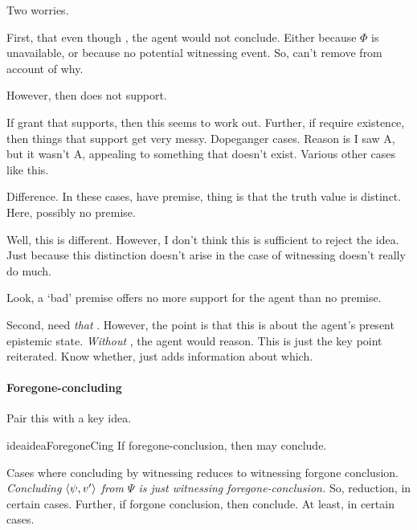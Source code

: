 \begin{note}
  Two worries.

  First, that even though , the agent would not conclude.
  Either because \(\Phi\) is unavailable, or because no potential witnessing event.
  So, can't remove  from account of why.

  However, then  does not support.

  If grant that  supports, then this seems to work out.
  Further, if require existence, then things that support get very messy.
  Dopeganger cases.
  Reason is I saw A, but it wasn't A, appealing to something that doesn't exist.
  Various other cases like this.

  Difference.
  In these cases, have premise, thing is that the truth value is distinct.
  Here, possibly no premise.

  Well, this is different.
  However, I don't think this is sufficient to reject the idea.
  Just because this distinction doesn't arise in the case of witnessing doesn't really do much.

  Look, a `bad' premise offers no more support for the agent than no premise.

  Second, need \emph{that} .
  However, the point is that this is about the agent's present epistemic state.
  \emph{Without} , the agent would reason.
  This is just the key point reiterated.
  Know whether,  just adds information about which.
\end{note}


\paragraph{Foregone-concluding}

\begin{note}
  Pair this with a key idea.

  \begin{restatable}{idea}{ideaForegoneCing}
    \label{idea:reassignment}
    If foregone-conclusion, then may conclude.
  \end{restatable}

  Cases where concluding by witnessing reduces to witnessing forgone conclusion.
  \emph{Concluding \(\langle \psi, v' \rangle\) from \(\Psi\) is just witnessing foregone-conclusion.}
  So, reduction, in certain cases.
  Further, if forgone conclusion, then conclude.
  At least, in certain cases.
\end{note}

